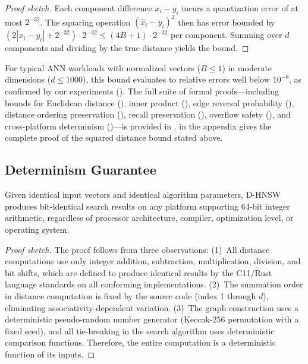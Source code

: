 \documentclass[10pt,journal,compsoc]{IEEEtran}
\newcommand{\dhnsw}{\textsc{D-HNSW}}
\begin{document}
\begin{proof}[Proof sketch]
Each component difference $x_i - y_i$ incurs a quantization error of at most $2^{-32}$. The squaring operation $(\hat{x}_i - \hat{y}_i)^2$ then has error bounded by $(2|x_i - y_i| + 2^{-32}) \cdot 2^{-32} \leq (4B + 1) \cdot 2^{-32}$ per component. Summing over $d$ components and dividing by the true distance yields the bound.
\end{proof}

For typical ANN workloads with normalized vectors ($B \leq 1$) in moderate dimensions ($d \leq 1000$), this bound evaluates to relative errors well below $10^{-8}$, as confirmed by our experiments (). The full suite of formal proofs---including bounds for Euclidean distance (), inner product (), edge reversal probability (), distance ordering preservation (), recall preservation (), overflow safety (), and cross-platform determinism ()---is provided in .  in the appendix gives the complete proof of the squared distance bound stated above.

\subsection{Determinism Guarantee}

\begin{theorem}
\label{thm:determinism}
Given identical input vectors and identical algorithm parameters, \dhnsw{} produces bit-identical search results on any platform supporting 64-bit integer arithmetic, regardless of processor architecture, compiler, optimization level, or operating system.
\end{theorem}

\begin{proof}[Proof sketch]
The proof follows from three observations: (1)~All distance computations use only integer addition, subtraction, multiplication, division, and bit shifts, which are defined to produce identical results by the C11/Rust language standards on all conforming implementations. (2)~The summation order in distance computation is fixed by the source code (index 1 through $d$), eliminating associativity-dependent variation. (3)~The graph construction uses a deterministic pseudo-random number generator (Keccak-256 permutation with a fixed seed), and all tie-breaking in the search algorithm uses deterministic comparison functions. Therefore, the entire computation is a deterministic function of its inputs.
\end{proof}
\end{document}
